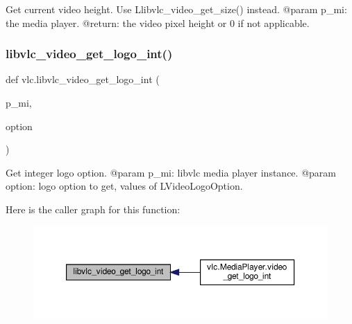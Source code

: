 \begin{DoxyVerb}Get current video height.
\deprecated Use L{libvlc_video_get_size}() instead.
@param p_mi: the media player.
@return: the video pixel height or 0 if not applicable.
\end{DoxyVerb}
 \mbox{\label{namespacevlc_a3b3d43d9f8102e847bc0ecc9c7bf734d}} 
\subsubsection{\texorpdfstring{libvlc\+\_\+video\+\_\+get\+\_\+logo\+\_\+int()}{libvlc\_video\_get\_logo\_int()}}
{\footnotesize\ttfamily def vlc.\+libvlc\+\_\+video\+\_\+get\+\_\+logo\+\_\+int (\begin{DoxyParamCaption}\item[{}]{p\+\_\+mi,  }\item[{}]{option }\end{DoxyParamCaption})}

\begin{DoxyVerb}Get integer logo option.
@param p_mi: libvlc media player instance.
@param option: logo option to get, values of L{VideoLogoOption}.
\end{DoxyVerb}
 Here is the caller graph for this function\+:
\nopagebreak
\begin{figure}[H]
\begin{center}
\leavevmode
\includegraphics[width=350pt]{namespacevlc_a3b3d43d9f8102e847bc0ecc9c7bf734d_icgraph}
\end{center}
\end{figure}
\mbox{\label{namespacevlc_a401766594b9c4244e6a0d82f41bb197d}} 
